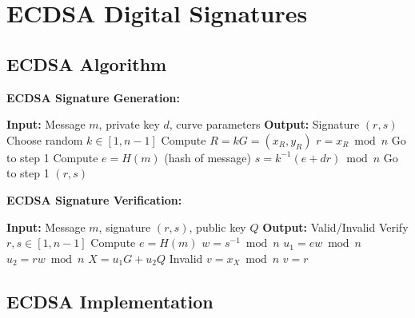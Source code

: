 \documentclass[11pt,a4paper]{article}
\begin{document}
\section{ECDSA Digital Signatures}

\subsection{ECDSA Algorithm}

\begin{mathbox}
\textbf{ECDSA Signature Generation:}
\begin{algorithmic}
\STATE \textbf{Input:} Message $m$, private key $d$, curve parameters
\STATE \textbf{Output:} Signature $(r, s)$
\STATE Choose random $k \in [1, n-1]$
\STATE Compute $R = kG = (x_R, y_R)$
\STATE $r = x_R \bmod n$
    \STATE Go to step 1
\ENDIF
\STATE Compute $e = H(m)$ (hash of message)
\STATE $s = k^{-1}(e + dr) \bmod n$
    \STATE Go to step 1
\ENDIF
\RETURN $(r, s)$
\end{algorithmic}
\end{mathbox}

\begin{mathbox}
\textbf{ECDSA Signature Verification:}
\begin{algorithmic}
\STATE \textbf{Input:} Message $m$, signature $(r, s)$, public key $Q$
\STATE \textbf{Output:} Valid/Invalid
\STATE Verify $r, s \in [1, n-1]$
\STATE Compute $e = H(m)$
\STATE $w = s^{-1} \bmod n$
\STATE $u_1 = ew \bmod n$
\STATE $u_2 = rw \bmod n$
\STATE $X = u_1G + u_2Q$
    \RETURN Invalid
\ENDIF
\STATE $v = x_X \bmod n$
\RETURN $v = r$
\end{algorithmic}
\end{mathbox}

\subsection{ECDSA Implementation}
\end{document}

